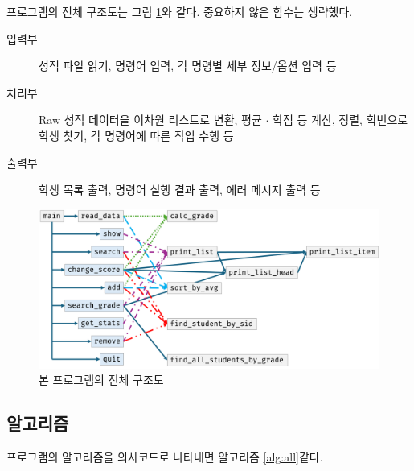 \documentclass{article}
\begin{document}
프로그램의 전체 구조도는 그림 \ref{fig:structurechart}와 같다. 중요하지 않은 함수는 생략했다.

\begin{description}
  \item[입력부] 성적 파일 읽기, 명령어 입력, 각 명령별 세부 정보/옵션 입력 등
  \item[처리부] Raw 성적 데이터을 이차원 리스트로 변환, 평균 $\cdot$ 학점 등 계산, 정렬, 학번으로 학생 찾기, 각 명령어에 따른 작업 수행 등
  \item[출력부] 학생 목록 출력, 명령어 실행 결과 출력, 에러 메시지 출력 등
\end{description}

\begin{figure}
  \includegraphics[width=\textwidth]{structurechart.png}
  \caption{본 프로그램의 전체 구조도}
  \label{fig:structurechart}
\end{figure}

\subsection{알고리즘}
프로그램의 알고리즘을 의사코드로 나타내면 알고리즘 \ref{alg:all}\과 같다.
\end{document}
